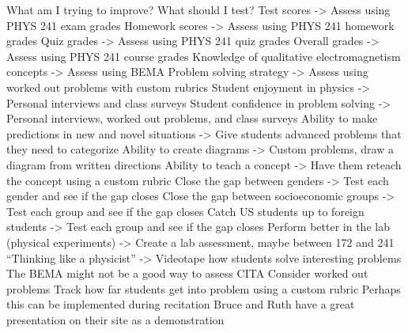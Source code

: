 What am I trying to improve? What should I test?
Test scores -> Assess using PHYS 241 exam grades
Homework scores -> Assess using PHYS 241 homework grades
Quiz grades -> Assess using PHYS 241 quiz grades
Overall grades -> Assess using PHYS 241 course grades
Knowledge of qualitative electromagnetism concepts -> Assess using BEMA
Problem solving strategy -> Assess using worked out problems with custom rubrics
Student enjoyment in physics -> Personal interviews and class surveys
Student confidence in problem solving -> Personal interviews, worked out problems, and class surveys
Ability to make predictions in new and novel situations -> Give students advanced problems that they need to categorize
Ability to create diagrams -> Custom problems, draw a diagram from written directions
Ability to teach a concept -> Have them reteach the concept using a custom rubric
Close the gap between genders -> Test each gender and see if the gap closes
Close the gap between socioeconomic groups -> Test each group and see if the gap closes
Catch US students up to foreign students -> Test each group and see if the gap closes
Perform better in the lab (physical experiments) -> Create a lab assessment, maybe between 172 and 241
“Thinking like a physicist” -> Videotape how students solve interesting problems
The BEMA might not be a good way to assess CITA
Consider worked out problems
Track how far students get into problem using a custom rubric
Perhaps this can be implemented during recitation
Bruce and Ruth have a great presentation on their site as a demonstration